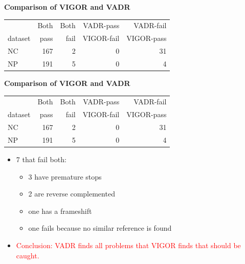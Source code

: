 \documentclass[landscape]{slides}
\begin{document}
\begin{slide}
\begin{center}
\textbf{Comparison of VIGOR and VADR}

\begin{tabular}{|l|r|r|r|r|}
\hline
         & Both       & Both       & VADR-pass  & VADR-fail  \\
 dataset & pass       & fail       & VIGOR-fail & VIGOR-pass \\ \hline
       NC &    167 &      2 &      0 &     31 \\ 
       NP &    191 &      5 &      0 &      4 \\ 
\hline 
\end{tabular}

\end{center}

\vfill
\end{slide}
\begin{slide}
\begin{center}
\textbf{Comparison of VIGOR and VADR}

\begin{tabular}{|l|r|r|r|r|}
\hline
         & Both       & Both       & VADR-pass  & VADR-fail  \\
 dataset & pass       & fail       & VIGOR-fail & VIGOR-pass \\ \hline
      NC &        167 &          2 &          0 &     31 \\ 
      NP &        191 &          5 &          0 &      4 \\ 
\hline 
\end{tabular}

\small
\begin{itemize}
\item 7 that fail both:
  \begin{itemize}
  \item 3 have premature stops
  \item 2 are reverse complemented
  \item one has a frameshift 
  \item one fails because no similar reference is found
  \end{itemize}
\item \textcolor{red}{Conclusion: VADR finds all problems that VIGOR finds that should
  be caught.}
\end{itemize}
\end{center}

\vfill
\end{slide}
\end{document}
